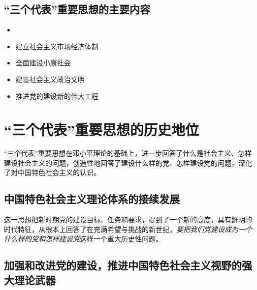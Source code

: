     \subsection{“三个代表”重要思想的主要内容}
        \begin{itemize}
            \item {}
            \item 建立社会主义市场经济体制
            \item 全面建设小康社会
            \item 建设社会主义政治文明
            \item 推进党的建设新的伟大工程
        \end{itemize}


\section{“三个代表”重要思想的历史地位}
    “三个代表”重要思想在邓小平理论的基础上，进一步回答了什么是社会主义、怎样建设社会主义的问题，创造性地回答了建设什么样的党、怎样建设党的问题，深化了对中国特色社会主义的认识。
    \subsection{中国特色社会主义理论体系的接续发展}
        这一思想把新时期党的建设目标、任务和要求，提到了一个新的高度，具有鲜明的时代特征，从根本上回答了在充满希望与挑战的新世纪，\emph{要把我们党建设成为一个什么样的党和怎样建设党}这样一个重大历史性问题。

    \subsection{加强和改进党的建设，推进中国特色社会主义视野的强大理论武器}
